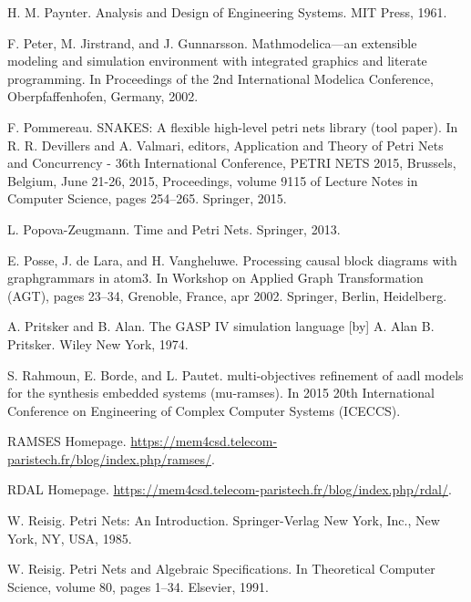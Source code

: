 \begin{description}[style=nextline,leftmargin=12mm,labelwidth=10mm,font=\normalfont]
\item[{[228]}] H. M. Paynter. Analysis and Design of Engineering Systems. MIT Press, 1961.

\item[{[229]}] F. Peter, M. Jirstrand, and J. Gunnarsson. Mathmodelica—an extensible modeling and simulation environment with integrated graphics and literate programming. In Proceedings of the 2nd International Modelica Conference, Oberpfaffenhofen, Germany, 2002.

\item[{[230]}] F. Pommereau. SNAKES: A flexible high-level petri nets library (tool paper). In R. R. Devillers and A. Valmari, editors, Application and Theory of Petri Nets and Concurrency - 36th International Conference, PETRI NETS 2015, Brussels, Belgium, June 21-26, 2015, Proceedings, volume 9115 of Lecture Notes in Computer Science, pages 254–265. Springer, 2015.

\item[{[231]}] L. Popova-Zeugmann. Time and Petri Nets. Springer, 2013.

\item[{[232]}] E. Posse, J. de Lara, and H. Vangheluwe. Processing causal block diagrams with graphgrammars in atom3. In Workshop on Applied Graph Transformation (AGT), pages 23–34, Grenoble, France, apr 2002. Springer, Berlin, Heidelberg.

\item[{[233]}] A. Pritsker and B. Alan. The GASP IV simulation language [by] A. Alan B. Pritsker. Wiley New York, 1974.

\item[{[234]}] S. Rahmoun, E. Borde, and L. Pautet. multi-objectives refinement of aadl models for the synthesis embedded systems (mu-ramses). In 2015 20th International Conference on Engineering of Complex Computer Systems (ICECCS).

\item[{[235]}] RAMSES Homepage. \url{https://mem4csd.telecom-paristech.fr/blog/index.php/ramses/}.

\item[{[236]}] RDAL Homepage. \url{https://mem4csd.telecom-paristech.fr/blog/index.php/rdal/}.

\item[{[237]}] W. Reisig. Petri Nets: An Introduction. Springer-Verlag New York, Inc., New York, NY, USA, 1985.

\item[{[238]}] W. Reisig. Petri Nets and Algebraic Specifications. In Theoretical Computer Science, volume 80, pages 1–34. Elsevier, 1991.


\end{description}
